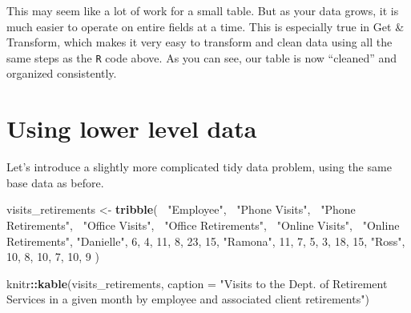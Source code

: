 \documentclass[]{book}
\newenvironment{Shaded}{\begin{snugshade}}{\end{snugshade}}
\newcommand{\CommentTok}[1]{\textcolor[rgb]{0.56,0.35,0.01}{\textit{#1}}}
\newcommand{\DataTypeTok}[1]{\textcolor[rgb]{0.13,0.29,0.53}{#1}}
\newcommand{\DecValTok}[1]{\textcolor[rgb]{0.00,0.00,0.81}{#1}}
\newcommand{\KeywordTok}[1]{\textcolor[rgb]{0.13,0.29,0.53}{\textbf{#1}}}
\newcommand{\NormalTok}[1]{#1}
\newcommand{\OperatorTok}[1]{\textcolor[rgb]{0.81,0.36,0.00}{\textbf{#1}}}
\newcommand{\OtherTok}[1]{\textcolor[rgb]{0.56,0.35,0.01}{#1}}
\newcommand{\StringTok}[1]{\textcolor[rgb]{0.31,0.60,0.02}{#1}}
\begin{document}
\begin{Shaded}
\begin{Highlighting}[]
{{{{{\CommentTok{#print to datatable}
\NormalTok{sites_cleaned}\OperatorTok{%
    \DataTypeTok{extensions =} \StringTok{'Buttons'}\NormalTok{, }
    \DataTypeTok{options =} \KeywordTok{list}\NormalTok{(}\DataTypeTok{dom =} \StringTok{'Bfrtip'}\NormalTok{, }
                   \DataTypeTok{buttons =} \StringTok{'excel'}\NormalTok{,}
                   \DataTypeTok{searching =} \OtherTok{FALSE}\NormalTok{))}
\end{Highlighting}
\end{Shaded}

\hypertarget{htmlwidget-88fbd7aa398f5d6c81bd}{}

This may seem like a lot of work for a small table. But as your data grows, it is much easier to operate on entire fields at a time. This is especially true in Get \& Transform, which makes it very easy to transform and clean data using all the same steps as the \texttt{R} code above. As you can see, our table is now ``cleaned'' and organized consistently.

\hypertarget{using-lower-level-data}{%
\section{Using lower level data}\label{using-lower-level-data}}

Let's introduce a slightly more complicated tidy data problem, using the same base data as before.

\begin{Shaded}
\begin{Highlighting}[]
\NormalTok{visits_retirements <-}\StringTok{ }\KeywordTok{tribble}\NormalTok{(}
  \OperatorTok{~}\StringTok{"Employee"}\NormalTok{, }\OperatorTok{~}\StringTok{"Phone Visits"}\NormalTok{, }\OperatorTok{~}\StringTok{"Phone Retirements"}\NormalTok{, }\OperatorTok{~}\StringTok{"Office Visits"}\NormalTok{, }\OperatorTok{~}\StringTok{"Office Retirements"}\NormalTok{, }\OperatorTok{~}\StringTok{"Online Visits"}\NormalTok{, }\OperatorTok{~}\StringTok{"Online Retirements"}\NormalTok{,}
  \StringTok{"Danielle"}\NormalTok{, }\DecValTok{6}\NormalTok{, }\DecValTok{4}\NormalTok{, }\DecValTok{11}\NormalTok{, }\DecValTok{8}\NormalTok{, }\DecValTok{23}\NormalTok{, }\DecValTok{15}\NormalTok{,}
  \StringTok{"Ramona"}\NormalTok{, }\DecValTok{11}\NormalTok{, }\DecValTok{7}\NormalTok{, }\DecValTok{5}\NormalTok{, }\DecValTok{3}\NormalTok{, }\DecValTok{18}\NormalTok{, }\DecValTok{15}\NormalTok{,}
  \StringTok{"Ross"}\NormalTok{, }\DecValTok{10}\NormalTok{, }\DecValTok{8}\NormalTok{, }\DecValTok{10}\NormalTok{, }\DecValTok{7}\NormalTok{, }\DecValTok{10}\NormalTok{, }\DecValTok{9} 
\NormalTok{)}

\NormalTok{knitr}\OperatorTok{::}\KeywordTok{kable}\NormalTok{(visits_retirements, }\DataTypeTok{caption =} \StringTok{"Visits to the Dept. of Retirement Services in a given month by employee and associated client retirements"}\NormalTok{)}
\end{Highlighting}
\end{Shaded}
\end{document}
